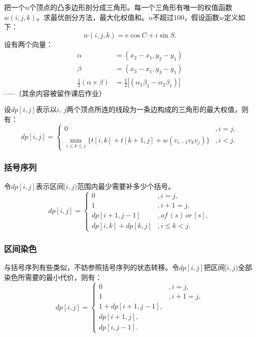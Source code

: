 把一个$n$个顶点的凸多边形剖分成三角形。每一个三角形有唯一的权值函数$w(i,j,k)$。求最优剖分方法，最大化权值和。$n$不超过100，假设函数$w$定义如下：
\begin{equation*}
    w(i,j,k)=e\cos C+i\sin S.
\end{equation*}
设有两个向量：
\begin{equation*}
    \begin{aligned}
        \alpha&=(x_2-x_1,y_2-y_1)\\
        \beta&=(x_3-x_1,y_3-y_1)\\
        \frac{1}{2}(\alpha\times\beta)&=\frac{1}{2}|(\alpha_1\beta_1-\alpha_2\beta_1)|
    \end{aligned}
\end{equation*}
$\cdots\cdots（其余内容被留作课后作业）$

设$dp[i,j]$表示以$i$, $j$两个顶点所连的线段为一条边构成的三角形的最大权值，则有：
\begin{equation*}
    dp[i,j]=
    \begin{cases}
        0&,i=j,\\
        \min\limits_{i\le k\le j}\{t[i,k]+t[k+1,j]+w(v_{i-1}v_kv_j)\}&,i<j.
    \end{cases}
\end{equation*}
\subsubsection{括号序列}
令$dp[i,j]$表示区间$[i,j)$范围内最少需要补多少个括号。
\begin{equation*}
    dp[i,j]=
    \begin{cases}
        0&,i=j,\\
        1&,i+1=j,\\
        dp[i+1,j-1]&,of\,(s)\,or\,[s],\\
        dp[i,k]+dp[k,j]&,i\le k<j.
    \end{cases}
\end{equation*}
\subsubsection{区间染色}
与括号序列有些类似，不妨参照括号序列的状态转移。令$dp[i,j]$把区间$[i,j)$全部染色所需要的最小代价，则有：
\begin{equation*}
    dp[i,j]=
    \begin{cases}
        0&,i=j,\\
        1&,i+1=j,\\
        1+dp[i+1,j-1],\\
        dp[i+1,j],\\
        dp[i,j-1].
    \end{cases}
\end{equation*}
